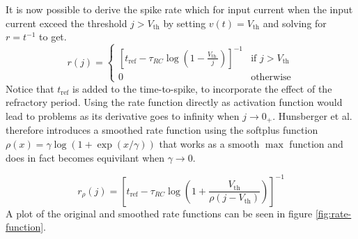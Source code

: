 \documentclass[a4paper,11pt]{article} %
\begin{document}
It is now possible to derive the spike rate which for input current 
when the input current exceed the threshold $j>V_\text{th}$ by setting $v(t) = V_\text{th}$ and solving for $r = t^{-1}$ to get.
\begin{equation}
  r(j) = \begin{cases} 
      \left[t_\text{ref} - \tau_{RC} \log \left(1-\frac{V_{\text {th }}}{j}\right) \right]^{-1} & \text{if } j > V_\text{th} \\
      0 & \text{otherwise}
  \end{cases}
\end{equation}
Notice that $t_\text{ref}$ is added to the time-to-spike, to incorporate the effect of the refractory period. Using the rate function directly as activation function would lead to problems as its derivative goes to infinity when $j \to 0_{+}$. Hunsberger et al. therefore introduces a smoothed rate function using the softplus function $\rho(x) = \gamma \log(1 + \exp(x / \gamma))$ that works as a smooth $\max$ function and does in fact becomes equivilant when $\gamma \to 0$.

\begin{equation}
  r_\rho(j) = \left[t_\text{ref} - \tau_{RC} \log \left(1 + \frac{ V_{\text{th}} }{ \rho(j - V_\text{th})}\right) \right]^{-1}
\end{equation}
A plot of the original and smoothed rate functions can be seen in figure \ref{fig:rate-function}.
\end{document}
